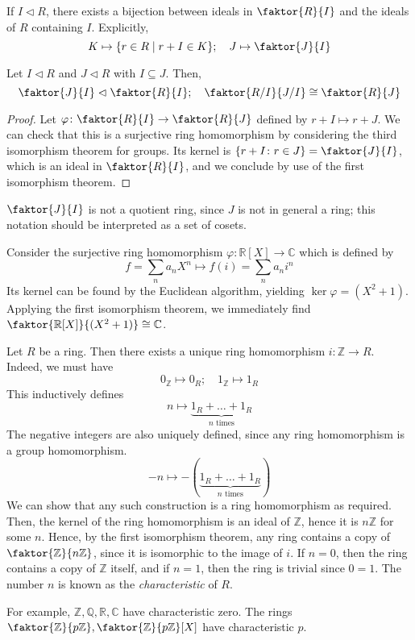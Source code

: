 \begin{remark}
	If \( I \vartriangleleft R \), there exists a bijection between ideals in \( \faktor{R}{I} \) and the ideals of \( R \) containing \( I \).
	Explicitly,
	\[
		K \mapsto \qty{r \in R \mid r + I \in K};\quad J \mapsto \faktor{J}{I}
	\]
\end{remark}
\begin{theorem}
	Let \( I \vartriangleleft R \) and \( J \vartriangleleft R \) with \( I \subseteq J \).
	Then,
	\[
		\faktor{J}{I} \vartriangleleft \faktor{R}{I};\quad \faktor{R/I}{J/I} \cong \faktor{R}{J}
	\]
\end{theorem}
\begin{proof}
	Let \( \varphi \colon \faktor{R}{I} \to \faktor{R}{J} \) defined by \( r+I \mapsto r+J \).
	We can check that this is a surjective ring homomorphism by considering the third isomorphism theorem for groups.
	Its kernel is \( \qty{r + I \colon r \in J} = \faktor{J}{I} \), which is an ideal in \( \faktor{R}{I} \), and we conclude by use of the first isomorphism theorem.
\end{proof}
\begin{remark}
	\( \faktor{J}{I} \) is not a quotient ring, since \( J \) is not in general a ring; this notation should be interpreted as a set of cosets.
\end{remark}
\begin{example}
	Consider the surjective ring homomorphism \( \varphi \colon \mathbb R[X] \to \mathbb C \) which is defined by
	\[
		f = \sum_n a_n X^n \mapsto f(i) = \sum_n a_n i^n
	\]
	Its kernel can be found by the Euclidean algorithm, yielding \( \ker \varphi = (X^2 + 1) \).
	Applying the first isomorphism theorem, we immediately find \( \faktor{\mathbb R[X]}{(X^2 + 1)} \cong \mathbb C \).
\end{example}
\begin{example}
	Let \( R \) be a ring.
	Then there exists a unique ring homomorphism \( i \colon \mathbb Z \to R \).
	Indeed, we must have
	\[
		0_{\mathbb Z} \mapsto 0_R;\quad 1_{\mathbb Z} \mapsto 1_R
	\]
	This inductively defines
	\[
		n \mapsto \underbrace{1_R + \dots + 1_R}_{n \text{ times}}
	\]
	The negative integers are also uniquely defined, since any ring homomorphism is a group homomorphism.
	\[
		-n \mapsto -(\underbrace{1_R + \dots + 1_R}_{n \text{ times}})
	\]
	We can show that any such construction is a ring homomorphism as required.
	Then, the kernel of the ring homomorphism is an ideal of \( \mathbb Z \), hence it is \( n\mathbb Z \) for some \( n \).
	Hence, by the first isomorphism theorem, any ring contains a copy of \( \faktor{\mathbb Z}{n\mathbb Z} \), since it is isomorphic to the image of \( i \).
	If \( n = 0 \), then the ring contains a copy of \( \mathbb Z \) itself, and if \( n = 1 \), then the ring is trivial since \( 0 = 1 \).
	The number \( n \) is known as the \textit{characteristic} of \( R \).

	For example, \( \mathbb Z, \mathbb Q, \mathbb R, \mathbb C \) have characteristic zero.
	The rings \( \faktor{\mathbb Z}{p \mathbb Z}, \faktor{\mathbb Z}{p \mathbb Z}[X] \) have characteristic \( p \).
\end{example}

